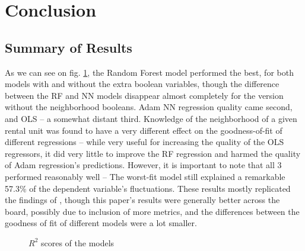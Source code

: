 \documentclass[12pt]{report}
\begin{document}
\section{Conclusion}
\subsection{Summary of Results}
As we can see on fig. \ref{fig:summary}, the Random Forest model performed the best, for both models with and without the extra boolean variables, though the difference between the RF and NN models disappear almost completely for the version without the neighborhood booleans. Adam NN regression quality came second, and OLS -- a somewhat distant third. Knowledge of the neighborhood of a given rental unit was found to have a very different effect on the goodness-of-fit of different regressions -- while very useful for increasing the quality of the OLS regressors, it did very little to improve the RF regression and harmed the quality of Adam regression's predictions. However, it is important to note that all 3 performed reasonably well -- The worst-fit model still explained a remarkable 57.3\% of the dependent variable's fluctuations. These results mostly replicated the findings of \cite{yoshida2022}, though this paper's results were generally better across the board, possibly due to inclusion of more metrics, and the differences between the goodness of fit of different models were a lot smaller.

\begin{figure}[h]
	\centering
	\caption{$R^2$ scores of the models}
	\label{fig:summary}
\end{figure}
\end{document}
